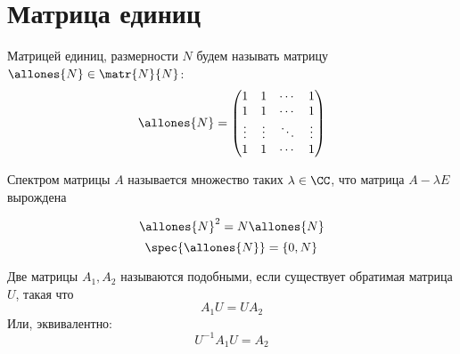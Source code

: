 \section{Матрица единиц}

Матрицей единиц, размерности \( N \) будем называть матрицу
\( \allones{N} \in \matr{N}{N} \):
\[
    \allones{N} =
    \begin{pmatrix}
    1 & 1  & \cdots & 1 \\
    1 & 1  & \cdots & 1 \\
    \vdots & \vdots & \ddots & \vdots \\
    1 & 1  & \cdots & 1
    \end{pmatrix}
\]

Спектром матрицы \( A \) называется множество таких \( \lambda\in\CC \),
что матрица \( A - \lambda E \) вырождена

\begin{propose}
\[
    \allones{N}^2 = N \allones{N}
    \]
\[
    \spec{\allones{N}} = \left\{ 0, N \right\}
    \]
\end{propose}

\begin{dfn}
    Две матрицы \( A_1, A_2 \)
    называются подобными, если существует обратимая матрица \( U \),
    такая что
    \[
        A_1 U = U A_2
        \]
    Или, эквивалентно:
    \[
        U^{-1} A_1 U = A_2
        \]
\end{dfn}

